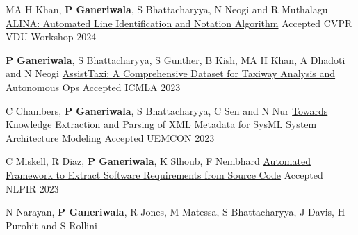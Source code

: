 \begin{cventries}
{\begin{cvitems}
\end{cvitems}
}
\cventry
{MA H Khan, \textbf{P Ganeriwala}, S Bhattacharyya, N Neogi and R Muthalagu }
{\href{https://openaccess.thecvf.com/content/CVPR2024W/VDU/html/Khan_ALINA_Advanced_Line_Identification_and_Notation_Algorithm_CVPRW_2024_paper.html}{ALINA: Automated Line Identification and Notation Algorithm}}
{Accepted}
{CVPR VDU Workshop 2024} 
{ %
\begin{cvitems}
\end{cvitems}
}
\cventry
{\textbf{P Ganeriwala}, S Bhattacharyya, S Gunther, B Kish, MA H Khan, A Dhadoti and N Neogi}
{\href{https://ieeexplore.ieee.org/abstract/document/10459875}{AssistTaxi: A Comprehensive Dataset for Taxiway Analysis and Autonomous Ops}}
{Accepted}
{ICMLA 2023} 
{ %
\begin{cvitems}
\end{cvitems}
}
\cventry
{C Chambers, \textbf{P Ganeriwala}, S Bhattacharyya, C Sen and N Nur }
{\href{https://ieeexplore.ieee.org/abstract/document/10316143}{Towards Knowledge Extraction and Parsing of XML Metadata for SysML System Architecture Modeling}}
{Accepted}
{UEMCON 2023} 
{ %
\begin{cvitems}
\end{cvitems}
}
\cventry
{C Miskell, R Diaz, \textbf{P Ganeriwala}, K Slhoub, F Nembhard}
{\href{https://dl.acm.org/doi/abs/10.1145/3639233.3639242}{Automated Framework to Extract Software Requirements from Source Code}}
{Accepted}
{NLPIR 2023} 
{ %
\begin{cvitems}
\end{cvitems}
}
\cventry
{N Narayan, \textbf{P Ganeriwala}, R Jones, M Matessa, S Bhattacharyya, J Davis, H Purohit and S Rollini}

\end{cventries}

